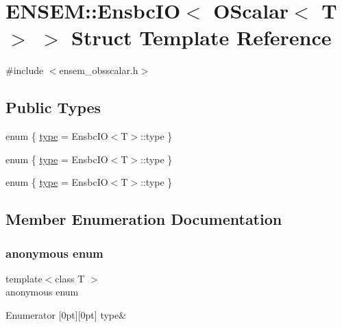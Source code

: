 \hypertarget{structENSEM_1_1EnsbcIO_3_01OScalar_3_01T_01_4_01_4}{}\section{E\+N\+S\+EM\+:\+:Ensbc\+IO$<$ O\+Scalar$<$ T $>$ $>$ Struct Template Reference}
\label{structENSEM_1_1EnsbcIO_3_01OScalar_3_01T_01_4_01_4}


{\ttfamily \#include $<$ensem\+\_\+obsscalar.\+h$>$}

\subsection*{Public Types}
\begin{DoxyCompactItemize}
\item 
enum \{ \mbox{\hyperlink{structENSEM_1_1EnsbcIO_3_01OScalar_3_01T_01_4_01_4_a1ccd9d15830fe7ffeb9c21aff2aae6c6a1225eb40e728dd20bf5cc62fdb91e6ad}{type}} = Ensbc\+IO$<$T$>$\+:\+:type
 \}
\item 
enum \{ \mbox{\hyperlink{structENSEM_1_1EnsbcIO_3_01OScalar_3_01T_01_4_01_4_a1ccd9d15830fe7ffeb9c21aff2aae6c6a1225eb40e728dd20bf5cc62fdb91e6ad}{type}} = Ensbc\+IO$<$T$>$\+:\+:type
 \}
\item 
enum \{ \mbox{\hyperlink{structENSEM_1_1EnsbcIO_3_01OScalar_3_01T_01_4_01_4_a1ccd9d15830fe7ffeb9c21aff2aae6c6a1225eb40e728dd20bf5cc62fdb91e6ad}{type}} = Ensbc\+IO$<$T$>$\+:\+:type
 \}
\end{DoxyCompactItemize}


\subsection{Member Enumeration Documentation}
\mbox{\label{structENSEM_1_1EnsbcIO_3_01OScalar_3_01T_01_4_01_4_a867f0972b39a3b5ee0583c5c2c4f50e0}} 
\subsubsection{\texorpdfstring{anonymous enum}{anonymous enum}}
{\footnotesize\ttfamily template$<$class T $>$ \\
anonymous enum}

\begin{DoxyEnumFields}{Enumerator}
[0pt][0pt]{}\mbox{\label{structENSEM_1_1EnsbcIO_3_01OScalar_3_01T_01_4_01_4_a1ccd9d15830fe7ffeb9c21aff2aae6c6a1225eb40e728dd20bf5cc62fdb91e6ad}} 
type&\\
\hline

\end{DoxyEnumFields}
\mbox{\label{structENSEM_1_1EnsbcIO_3_01OScalar_3_01T_01_4_01_4_acede6091c60bccec029cd25516a67258}} 
